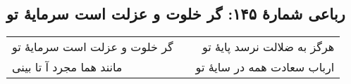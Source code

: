 \begin{center}
\section*{رباعی شمارهٔ ۱۴۵: گر خلوت و عزلت است سرمایۀ تو}
\label{sec:145}
\begin{longtable}{l p{0.5cm} r}
گر خلوت و عزلت است سرمایهٔ تو
&&
هرگز به ضلالت نرسد پایهٔ تو
\\
مانند هما مجرد آ تا بینی
&&
ارباب سعادت همه در سایهٔ تو
\\
\end{longtable}
\end{center}
